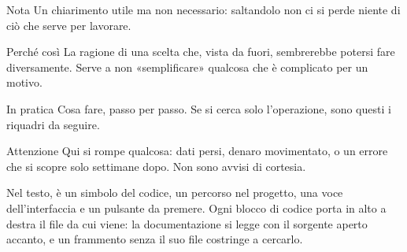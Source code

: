 \vspace{3mm}
\begin{nota}{Nota}
Un chiarimento utile ma non necessario: saltandolo non ci si perde niente di
ciò che serve per lavorare.
\end{nota}

\begin{perche}{Perché così}
La ragione di una scelta che, vista da fuori, sembrerebbe potersi fare
diversamente. Serve a non «semplificare» qualcosa che è complicato per un
motivo.
\end{perche}

\begin{pratica}{In pratica}
Cosa fare, passo per passo. Se si cerca solo l'operazione, sono questi i
riquadri da seguire.
\end{pratica}

\begin{attenzione}{Attenzione}
Qui si rompe qualcosa: dati persi, denaro movimentato, o un errore che si
scopre solo settimane dopo. Non sono avvisi di cortesia.
\end{attenzione}

\vspace{4mm}
\noindent
Nel testo,  è un simbolo del codice,  un percorso nel
progetto,  una voce dell'interfaccia e  un
pulsante da premere. Ogni blocco di codice porta in alto a destra il file da
cui viene: la documentazione si legge con il sorgente aperto accanto, e un
frammento senza il suo file costringe a cercarlo.

\cleardoublepage

